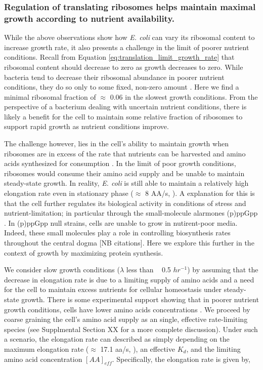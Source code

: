 \subsubsection{Regulation of translating ribosomes helps maintain maximal growth
according to nutrient availability.}

While the above observations show how \textit{E. coli}
can vary its ribosomal content to increase growth rate, it also presents a
challenge in the limit of poorer nutrient conditions. Recall from Equation
\ref{eq:translation_limit_growth_rate} that ribosomal content should decrease to
zero as growth decreases to zero. While bacteria tend to decrease their
ribosomal abundance in poorer nutrient conditions, they do so only to some
fixed, non-zero amount \citep{scott2010, liebermeister2014}. Here we find a
minimal ribosomal fraction of $\approx$ 0.06 in the slowest growth conditions.
From the perspective of a bacterium dealing with uncertain nutrient conditions,
there is likely a benefit for the cell to maintain some relative fraction of
ribosomes to support rapid growth as nutrient conditions improve.

The challenge however, lies in the cell's ability to maintain growth when
ribosomes are in excess of the rate that nutrients can be harvested and amino
acids synthesized for consumption . In the limit
of poor growth conditions, ribosomes would consume their amino acid supply and
be unable to maintain steady-state growth. In reality, \textit{E. coli} is still
able to maintain a relatively high elongation rate even in stationary phase
($\approx$ 8 AA/s, \citep{dai2016, dai2018}). A explanation for this is that the
cell further regulates its biological activity in conditions of stress and
nutrient-limitation; in particular through the small-molecule alarmones (p)ppGpp
\citep{harris2018}. In  (p)ppGpp null strains, cells are unable to grow in
nutirent-poor media. Indeed, these small molecules play a role in controlling
biosynthesis rates throughout the central dogma [NB citations]. Here we explore
this further in the context of  growth by maximizing protein synthesis.

We consider slow growth conditions ($\lambda$ less than ~ 0.5 $hr^{-1}$) by
assuming that the decrease in elongation rate is due to a
limiting supply of amino acids and a need for the cell to maintain excess
nutrients for cellular homeostasis under steady-state growth. There is some
experimental support showing that in poorer nutrient growth conditions, cells
have lower amino acids concentrations \citep{bennett2009}. We proceed by coarse
graining the cell's amino acid supply as an single, effective rate-limiting
species (see Supplmental Section XX for a more complete discussion). Under such a scenario,
the elongation rate can described as simply depending on the maximum elongation
rate ($\approx$ 17.1 aa/s, \citep{dai2016, dai2018}), an effective $K_d$, and
the limiting amino acid concentration $[AA]_{eff}$. Specifically, the elongation
rate is given by,

